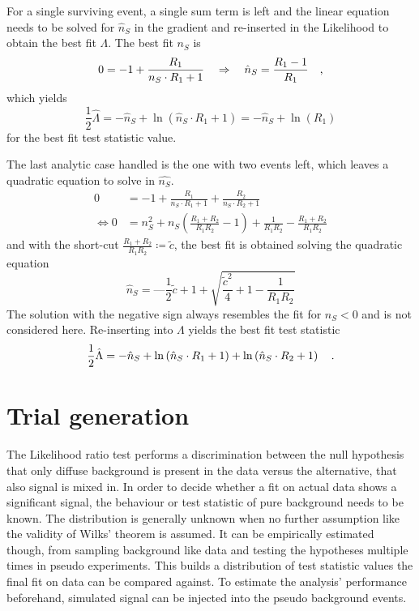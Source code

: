 For a single surviving event, a single sum term is left and the linear equation needs to be solved for $\hat{n}_S$ in the gradient and re-inserted in the Likelihood to obtain the best fit $\Lambda$.
The best fit $n_S$ is
\begin{equation}
  0 = -1 + \frac{R_1}{n_S\cdot R_1 + 1}
    \quad\Rightarrow\quad \hat{n}_S = \frac{R_1 - 1}{R_1}
  \quad\text{,}
\end{equation}
which yields
\begin{equation}
  \frac{1}{2}\hat{\Lambda}
    = -\hat{n}_S + \ln\left( \hat{n}_S \cdot R_1 + 1 \right)
    = -\hat{n}_S + \ln(R_1)
\end{equation}
for the best fit test statistic value.

The last analytic case handled is the one with two events left, which leaves a quadratic equation to solve in $\hat{n_S}$.
\begin{align}
  0 &= -1 + \frac{R_1}{n_S\cdot R_1 + 1} + \frac{R_2}{n_S\cdot R_2 + 1} \\
  \Leftrightarrow
  0 &= n_S^2 + n_S \left(\frac{R_1 + R_2}{R_1 R_2} - 1\right) +
       \frac{1}{R_1 R_2} - \frac{R_1 + R_2}{R_1 R_2}
\end{align}
and with the short-cut $\frac{R_1 + R_2}{R_1 R_2} \coloneq\tilde{c}$, the best fit is obtained solving the quadratic equation
\begin{equation}
  \hat{n}_S = —\frac{1}{2}\tilde{c} + 1 + \sqrt{\frac{\tilde{c}^2}{4} + 1 - \frac{1}{R_1 R_2}}
\end{equation}
The solution with the negative sign always resembles the fit for $n_S < 0$ and is not considered here.
Re-inserting into $\Lambda$ yields the best fit test statistic
\begin{equation}
  \frac{1}{2}\hat{\Lambda} = -\hat{n}_S +
                             \ln\left( \hat{n}_S \cdot R_1 + 1 \right) +
                             \ln\left( \hat{n}_S \cdot R_2 + 1 \right)
  \quad\text{.}
\end{equation}


\section{Trial generation}
The Likelihood ratio test performs a discrimination between the null hypothesis that only diffuse background is present in the data versus the alternative, that also signal is mixed in.
In order to decide whether a fit on actual data shows a significant signal, the behaviour or test statistic of pure background needs to be known.
The distribution is generally unknown when no further assumption like the validity of Wilks' theorem is assumed.
It can be empirically estimated though, from sampling background like data and testing the hypotheses multiple times in pseudo experiments.
This builds a distribution of test statistic values the final fit on data can be compared against.
To estimate the analysis' performance beforehand, simulated signal can be injected into the pseudo background events.

